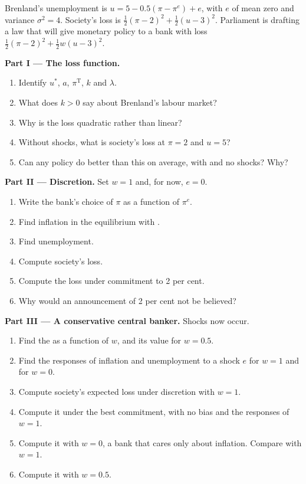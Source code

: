\begin{problem}
\label{pb:b2:expectations-and-lucas-critique:1}
Brenland's unemployment is $u = 5 - 0.5(\pi - \pi^e) + e$, with $e$ of mean zero and variance $\sigma^2 = 4$. Society's loss is $\tfrac12(\pi - 2)^2 + \tfrac12(u - 3)^2$. Parliament is drafting a law that will
give monetary policy to a bank with loss $\tfrac12(\pi - 2)^2 + \tfrac12w(u - 3)^2$.

\medskip
\noindent\textbf{Part I --- The loss function.}
\begin{enumerate}
  \item Identify $u^*$, $a$, $\pi^{\mathrm T}$, $k$ and $\lambda$.
  \item What does $k > 0$ say about Brenland's labour market?
  \item Why is the loss quadratic rather than linear?
  \item Without shocks, what is society's loss at $\pi = 2$ and $u = 5$?
  \item Can any policy do better than this on average, with  and no shocks? Why?
\end{enumerate}

\medskip
\noindent\textbf{Part II --- Discretion.} Set $w = 1$ and, for now, $e = 0$.
\begin{enumerate}[resume]
  \item Write the bank's choice of $\pi$ as a function of $\pi^e$.
  \item Find inflation in the equilibrium with .
  \item Find unemployment.
  \item Compute society's loss.
  \item Compute the loss under commitment to 2 per cent.
  \item Why would an announcement of 2 per cent not be believed?
\end{enumerate}

\medskip
\noindent\textbf{Part III --- A conservative central banker.} Shocks now occur.
\begin{enumerate}[resume]
  \item Find the  as a function of $w$, and its value for $w = 0.5$.
  \item Find the responses of inflation and unemployment to a shock $e$ for $w = 1$ and for $w = 0$.
  \item Compute society's expected loss under discretion with $w = 1$.
  \item Compute it under the best commitment, with no bias and the responses of $w = 1$.
  \item Compute it with $w = 0$, a bank that cares only about inflation. Compare with $w = 1$.
  \item Compute it with $w = 0.5$.
\end{enumerate}


\end{problem}
